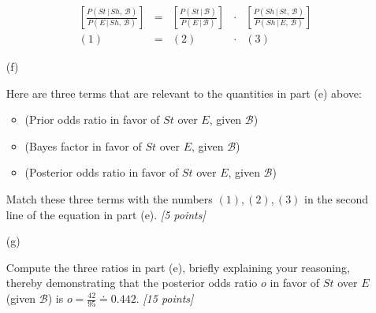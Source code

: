 \documentclass[12pt]{article}
\newcommand{\given}{\, | \,}
\begin{document}
\begin{itemize}
\begin{center}

\Large

\[
\begin{array}{ccccc}
\left[ \frac{ P ( St \given Sh, \, \mathcal{ B } ) }{ P ( E \given Sh, \, \mathcal{ B } ) } \right] & = & \left[ \frac{ P ( St \given \mathcal{ B } ) }{ P ( E \given \mathcal{ B } ) } \right] & \cdot & \left[ \frac{ P ( Sh \given St, \, \mathcal{ B } ) }{ P ( Sh \given E, \, \mathcal{ B } ) } \right] \\( 1 ) & = & ( 2 ) & \cdot & ( 3 )
\end{array}
\]

\normalsize

\end{center}

\vspace*{0.5in}

\item[(f)]

Here are three terms that are relevant to the quantities in part (e) above:

\begin{itemize}

\item

(Prior odds ratio in favor of $St$ over $E$, given $\mathcal{ B }$)

\item

(Bayes factor in favor of $St$ over $E$, given $\mathcal{ B }$)

\item

(Posterior odds ratio in favor of $St$ over $E$, given $\mathcal{ B }$)

\end{itemize}

Match these three terms with the numbers $( 1 ), ( 2 ), ( 3 )$ in the second line of the equation in part (e). \textit{[5 points]}

\vspace*{0.5in}

\item[(g)]

Compute the three ratios in part (e), briefly explaining your reasoning, thereby demonstrating that the posterior odds ratio $o$ in favor of $St$ over $E$ (given $\mathcal{ B }$) is $o = \frac{ 42 }{ 95 } \doteq 0.442$. \textit{[15 points]}

\vspace*{1.0in}


\end{itemize}
\end{document}
